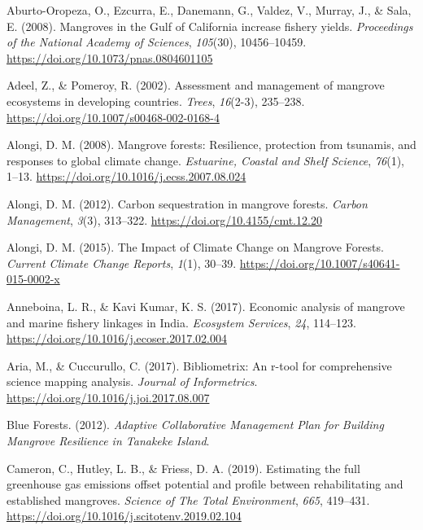 \documentclass[
  12pt,
]{article}
\newlength{\cslhangindent}
\newenvironment{CSLReferences}[2] %
 {\begin{list}{}{%
  \setlength{\itemindent}{0pt}
  \setlength{\leftmargin}{0pt}
  \setlength{\parsep}{0pt}
  \ifodd #1
   \setlength{\leftmargin}{\cslhangindent}
   \setlength{\itemindent}{-1\cslhangindent}
  \fi
  \setlength{\itemsep}{#2\baselineskip}}}
 {\end{list}}
\begin{document}
\label{refs}
\begin{CSLReferences}{1}{2}
Aburto-Oropeza, O., Ezcurra, E., Danemann, G., Valdez, V., Murray, J., \& Sala, E. (2008). Mangroves in the {Gulf} of {California} increase fishery yields. \emph{Proceedings of the National Academy of Sciences}, \emph{105}(30), 10456--10459. \url{https://doi.org/10.1073/pnas.0804601105}

Adeel, Z., \& Pomeroy, R. (2002). Assessment and management of mangrove ecosystems in developing countries. \emph{Trees}, \emph{16}(2-3), 235--238. \url{https://doi.org/10.1007/s00468-002-0168-4}

Alongi, D. M. (2008). Mangrove forests: {Resilience}, protection from tsunamis, and responses to global climate change. \emph{Estuarine, Coastal and Shelf Science}, \emph{76}(1), 1--13. \url{https://doi.org/10.1016/j.ecss.2007.08.024}

Alongi, D. M. (2012). Carbon sequestration in mangrove forests. \emph{Carbon Management}, \emph{3}(3), 313--322. \url{https://doi.org/10.4155/cmt.12.20}

Alongi, D. M. (2015). The {Impact} of {Climate Change} on {Mangrove Forests}. \emph{Current Climate Change Reports}, \emph{1}(1), 30--39. \url{https://doi.org/10.1007/s40641-015-0002-x}

Anneboina, L. R., \& Kavi Kumar, K. S. (2017). Economic analysis of mangrove and marine fishery linkages in {India}. \emph{Ecosystem Services}, \emph{24}, 114--123. \url{https://doi.org/10.1016/j.ecoser.2017.02.004}

Aria, M., \& Cuccurullo, C. (2017). Bibliometrix: An r-tool for comprehensive science mapping analysis. \emph{Journal of Informetrics}. \url{https://doi.org/10.1016/j.joi.2017.08.007}

Blue Forests. (2012). \emph{Adaptive {Collaborative} {Management} {Plan} for {Building} {Mangrove} {Resilience} in {Tanakeke} {Island}}.

Cameron, C., Hutley, L. B., \& Friess, D. A. (2019). Estimating the full greenhouse gas emissions offset potential and profile between rehabilitating and established mangroves. \emph{Science of The Total Environment}, \emph{665}, 419--431. \url{https://doi.org/10.1016/j.scitotenv.2019.02.104}


\end{CSLReferences}
\end{document}
